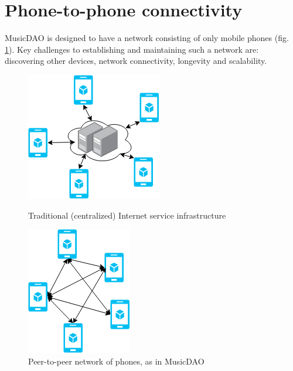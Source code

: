 \section{Phone-to-phone connectivity}
MusicDAO is designed to have a network consisting of only mobile phones (fig. \ref{fig:decentralized-phones}). Key challenges to establishing and maintaining such a network are: discovering other devices, network connectivity, longevity and scalability.

\begin{figure}
        \centering
        \includegraphics[width=0.6\linewidth]{design/centralized-service.png}
        \caption{Traditional (centralized) Internet service infrastructure}
        \label{fig:centralized-service}
    \endminipage\hfill
        \centering
        \includegraphics[width=0.6\linewidth]{design/decentralized-phones.png}
        \caption{Peer-to-peer network of phones, as in MusicDAO}
        \label{fig:decentralized-phones}
    \endminipage
\end{figure}

